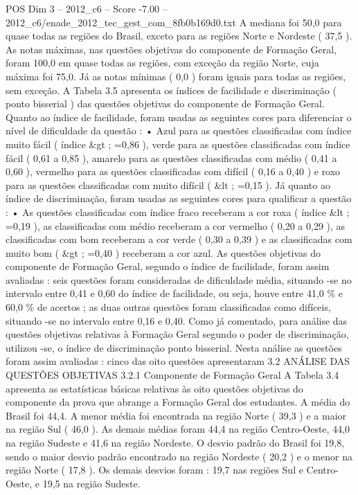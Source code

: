 \begin{textsample}{POS Dim 3 – 2012\_c6 – Score -7.00 – 2012\_c6/enade\_2012\_tec\_gest\_com\_8fb0b169d0.txt}
A mediana foi 50,0 para quase todas as regiões do Brasil, exceto para as regiões Norte e Nordeste ( 37,5 ).
As notas máximas, nas questões objetivas do componente de Formação Geral, foram 100,0 em quase todas as regiões, com exceção da região Norte, cuja máxima foi 75,0.
Já as notas mínimas ( 0,0 ) foram iguais para todas as regiões, sem exceção.
A Tabela 3.5 apresenta os índices de facilidade e discriminação ( ponto bisserial ) das questões objetivas do componente de Formação Geral.
Quanto ao índice de facilidade, foram usadas as seguintes cores para diferenciar o nível de dificuldade da questão : • Azul para as questões classificadas com índice muito fácil ( índice \&gt ; =0,86 ), verde para as questões classificadas com índice fácil ( 0,61 a 0,85 ), amarelo para as questões classificadas com médio ( 0,41 a 0,60 ), vermelho para as questões classificadas com difícil ( 0,16 a 0,40 ) e roxo para as questões classificadas com muito difícil ( \&lt ; =0,15 ).
Já quanto ao índice de discriminação, foram usadas as seguintes cores para qualificar a questão : • As questões classificadas com índice fraco receberam a cor roxa ( índice \&lt ; =0,19 ), as classificadas com médio receberam a cor vermelho ( 0,20 a 0,29 ), as classificadas com bom receberam a cor verde ( 0,30 a 0,39 ) e as classificadas com muito bom ( \&gt ; =0,40 ) receberam a cor azul.
As questões objetivas do componente de Formação Geral, segundo o índice de facilidade, foram assim avaliadas : seis questões foram consideradas de dificuldade média, situando -se no intervalo entre 0,41 e 0,60 do índice de facilidade, ou seja, houve entre 41,0 \% e 60,0 \% de acertos ; as duas outras questões foram classificadas como difíceis, situando -se no intervalo entre 0,16 e 0,40.
Como já comentado, para análise das questões objetivas relativas à Formação Geral segundo o poder de discriminação, utilizou -se, o índice de discriminação ponto bisserial.
Nesta análise as questões foram assim avaliadas : cinco das oito questões apresentaram 3.2 ANÁLISE DAS QUESTÕES OBJETIVAS 3.2.1 Componente de Formação Geral A Tabela 3.4 apresenta as estatísticas básicas relativas às oito questões objetivas do componente da prova que abrange a Formação Geral dos estudantes.
A média do Brasil foi 44,4.
A menor média foi encontrada na região Norte ( 39,3 ) e a maior na região Sul ( 46,0 ).
As demais médias foram 44,4 na região Centro-Oeste, 44,0 na região Sudeste e 41,6 na região Nordeste.
O desvio padrão do Brasil foi 19,8, sendo o maior desvio padrão encontrado na região Nordeste ( 20,2 ) e o menor na região Norte ( 17,8 ).
Os demais desvios foram : 19,7 nas regiões Sul e Centro-Oeste, e 19,5 na região Sudeste.

\end{textsample}
